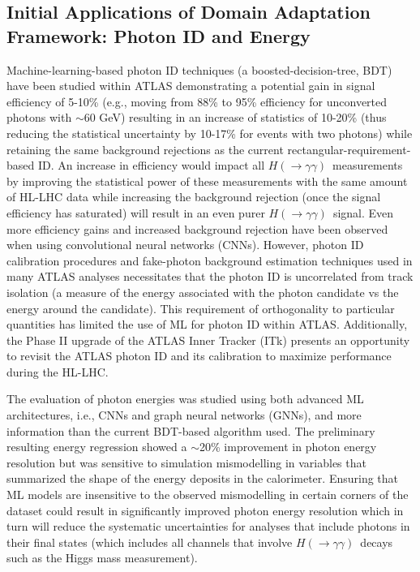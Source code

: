 \documentclass[letter, USenglish, 11pt, subfigure]{article}
\newcommand{\hyy}{\ensuremath{H(\to\gamma\gamma)}}
\begin{document}
\subsection{Initial Applications of Domain Adaptation Framework: Photon ID and Energy}

Machine-learning-based photon ID techniques (a boosted-decision-tree, BDT) have been studied within ATLAS demonstrating a potential gain in signal efficiency of 5-10\% (e.g., moving from 88\% to 95\% efficiency for unconverted photons with \pt$\sim$60 GeV) resulting in an increase of statistics of 10-20\% (thus reducing the statistical uncertainty by 10-17\% for events with two photons) while retaining the same background rejections as the current rectangular-requirement-based ID. An increase in efficiency would impact all \hyy\  measurements by improving the statistical power of these measurements with the same amount of HL-LHC data while increasing the background rejection (once the signal efficiency has saturated) will result in an even purer \hyy\  signal. Even more efficiency gains and increased background rejection have been observed when using convolutional neural networks (CNNs). However, photon ID calibration procedures and fake-photon background estimation techniques used in many ATLAS analyses necessitates that the photon ID is uncorrelated from track isolation (a measure of the energy associated with the photon candidate vs the energy around the candidate). This requirement of orthogonality to particular quantities has limited the use of ML for photon ID within ATLAS. Additionally, the Phase II upgrade of the ATLAS Inner Tracker (ITk) presents an opportunity to revisit the ATLAS photon ID and its calibration to maximize performance during the HL-LHC. 

The evaluation of photon energies was studied using both advanced ML architectures, i.e., CNNs and graph neural networks (GNNs), and more information than the current BDT-based algorithm used. The preliminary resulting energy regression showed a $\sim$20\% improvement in photon energy resolution but was sensitive to simulation mismodelling in variables that summarized the shape of the energy deposits in the calorimeter. Ensuring that ML models are insensitive to the observed mismodelling in certain corners of the dataset could result in significantly improved photon energy resolution which in turn will reduce the systematic uncertainties for analyses that include photons in their final states (which includes all channels that involve \hyy\ decays such as the Higgs mass measurement).
\end{document}
